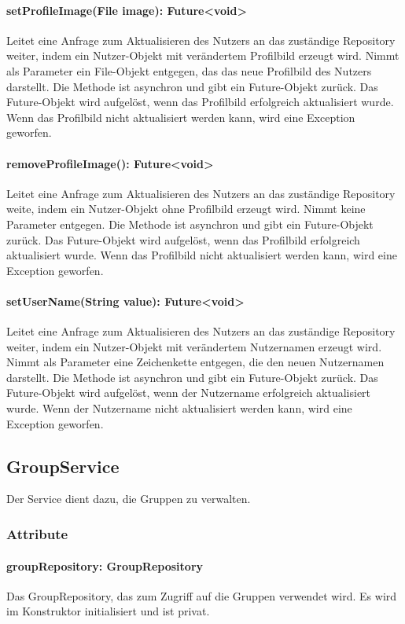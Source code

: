 \documentclass[parskip=full]{scrartcl}
\begin{document}
\paragraph{setProfileImage(File image): Future<void>}
Leitet eine Anfrage zum Aktualisieren des Nutzers an das zuständige Repository weiter, indem ein Nutzer-Objekt mit verändertem Profilbild erzeugt wird. Nimmt als Parameter ein File-Objekt entgegen, das das neue Profilbild des Nutzers darstellt. Die Methode ist asynchron und gibt ein Future-Objekt zurück. Das Future-Objekt wird aufgelöst, wenn das Profilbild erfolgreich aktualisiert wurde. Wenn das Profilbild nicht aktualisiert werden kann, wird eine Exception geworfen.
\paragraph{removeProfileImage(): Future<void>}
Leitet eine Anfrage zum Aktualisieren des Nutzers an das zuständige Repository weite, indem ein Nutzer-Objekt ohne Profilbild erzeugt wird. Nimmt keine Parameter entgegen. Die Methode ist asynchron und gibt ein Future-Objekt zurück. Das Future-Objekt wird aufgelöst, wenn das Profilbild erfolgreich aktualisiert wurde. Wenn das Profilbild nicht aktualisiert werden kann, wird eine Exception geworfen.
\paragraph{setUserName(String value): Future<void>}
Leitet eine Anfrage zum Aktualisieren des Nutzers an das zuständige Repository weiter, indem ein Nutzer-Objekt mit verändertem Nutzernamen erzeugt wird. Nimmt als Parameter eine Zeichenkette entgegen, die den neuen Nutzernamen darstellt. Die Methode ist asynchron und gibt ein Future-Objekt zurück. Das Future-Objekt wird aufgelöst, wenn der Nutzername erfolgreich aktualisiert wurde. Wenn der Nutzername nicht aktualisiert werden kann, wird eine Exception geworfen.

\newpage
\subsection{GroupService}
Der Service dient dazu, die Gruppen zu verwalten.
\subsubsection*{Attribute}
\paragraph{groupRepository: GroupRepository}
Das GroupRepository, das zum Zugriff auf die Gruppen verwendet wird. Es wird im Konstruktor initialisiert und ist privat.
\end{document}
